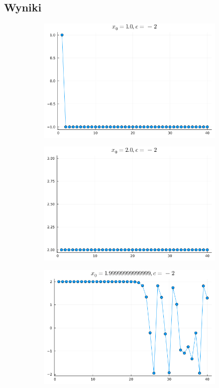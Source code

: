 \documentclass{article}
\def\v{0.47}
\begin{document}
\subsection*{Wyniki}
	\begin{figure}[H]
		\centering
		\begin{subfigure}[b]{\v\linewidth}
			\includegraphics[width=\linewidth]{graphs/1.png}
		\end{subfigure}
		\begin{subfigure}[b]{\v\linewidth}
			\includegraphics[width=\linewidth]{graphs/2.png}
		\end{subfigure}
		\begin{subfigure}[b]{\v\linewidth}
			\includegraphics[width=\linewidth]{graphs/3.png}

\end{subfigure}
\end{figure}
\end{document}
